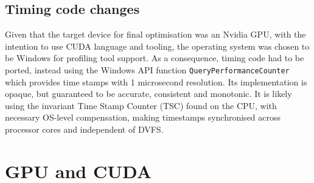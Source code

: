 \documentclass[11pt, oneside, a4paper]{article}
\begin{document}
\subsection{Timing code changes} %
\label{sub:timing_code_changes}
Given that the target device for final optimisation was an Nvidia GPU, with the intention to use CUDA language and tooling, the operating system was chosen to be Windows for profiling tool support. As a consequence, timing code had to be ported, instead using the Windows API function \texttt{QueryPerformanceCounter}\cite{QPC} which provides time stamps with 1 microsecond resolution. Its implementation is opaque, but guaranteed to be accurate, consistent and monotonic. It is likely using the invariant Time Stamp Counter (TSC) found on the CPU, with necessary OS-level compensation, making timestamps synchronised across processor cores and independent of DVFS.





\section{GPU and CUDA} %
\label{sec:gpu_and_cuda}











\end{document}
